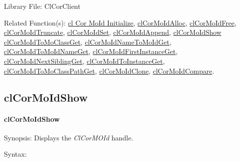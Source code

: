\begin{flushleft}
\begin{Desc}
\item[Library File:]Cl\-Cor\-Client\end{Desc}
\begin{Desc}
\item[Related Function(s):]
\hyperlink{pagecor112}{cl  Cor  MoId  Initialize}, 
\hyperlink{pagecor113}{cl\-Cor\-MoId\-Alloc}, 
\hyperlink{pagecor114}{cl\-Cor\-MoId\-Free}, 
\hyperlink{pagecor115}{cl\-Cor\-MoId\-Truncate}, 
\hyperlink{pagecor116}{cl\-Cor\-MoId\-Set}, 
\hyperlink{pagecor117}{cl\-Cor\-MoId\-Append}, 
\hyperlink{pagecor119}{cl\-Cor\-MoId\-Show}
\hyperlink{pagecor120}{cl\-Cor\-MoId\-To\-Mo\-Class\-Get}, 
\hyperlink{pagecor121}{cl\-Cor\-MoId\-Name\-To\-MoId\-Get},
\hyperlink{pagecor122}{cl\-Cor\-MoId\-To\-MoId\-Name\-Get}, 
\hyperlink{pagecor123}{cl\-Cor\-MoId\-First\-Instance\-Get}, 
\hyperlink{pagecor124}{cl\-Cor\-MoId\-Next\-Sibling\-Get}, 
\hyperlink{pagecor125}{cl\-Cor\-MoId\-To\-Instance\-Get}, 
\hyperlink{pagecor126}{cl\-Cor\-MoId\-To\-Mo\-Class\-Path\-Get}, 
\hyperlink{pagecor127}{cl\-Cor\-MoId\-Clone}, 
\hyperlink{pagecor128}{cl\-Cor\-MoId\-Compare}. \end{Desc}
\newpage


\subsection{clCorMoIdShow}
\hypertarget{pagecor119}{}\paragraph{cl\-Cor\-MoId\-Show}\label{pagecor119}
\begin{Desc}
\item[Synopsis:]Displays the \textit{ClCorMOId} handle.\end{Desc}
\begin{Desc}
\item[Syntax:]


\end{Desc}
\end{flushleft}
